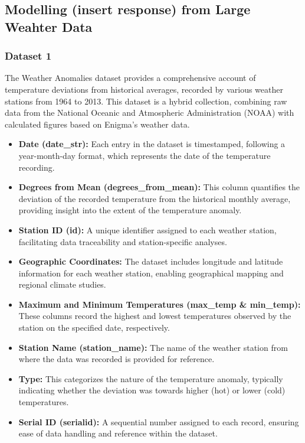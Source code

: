 \documentclass[12pt, twoside,hidelinks]{article}
\theoremstyle{definition}
\numberwithin{equation}{section}
\begin{document}
\subsection{Modelling (insert response) from Large Weahter Data}


\subsubsection*{Dataset 1}


The Weather Anomalies dataset provides a comprehensive account of temperature deviations from historical averages, recorded by various weather stations from 1964 to 2013. This dataset is a hybrid collection, combining raw data from the National Oceanic and Atmospheric Administration (NOAA) with calculated figures based on Enigma's weather data.

\begin{itemize}
    \item \textbf{Date (date\_str):} Each entry in the dataset is timestamped, following a year-month-day format, which represents the date of the temperature recording.
    
    \item \textbf{Degrees from Mean (degrees\_from\_mean):} This column quantifies the deviation of the recorded temperature from the historical monthly average, providing insight into the extent of the temperature anomaly.
    
    \item \textbf{Station ID (id):} A unique identifier assigned to each weather station, facilitating data traceability and station-specific analyses.
    
    \item \textbf{Geographic Coordinates:} The dataset includes longitude and latitude information for each weather station, enabling geographical mapping and regional climate studies.
    
    \item \textbf{Maximum and Minimum Temperatures (max\_temp \& min\_temp):} These columns record the highest and lowest temperatures observed by the station on the specified date, respectively.
    
    \item \textbf{Station Name (station\_name):} The name of the weather station from where the data was recorded is provided for reference.
    
    \item \textbf{Type:} This categorizes the nature of the temperature anomaly, typically indicating whether the deviation was towards higher (hot) or lower (cold) temperatures.
    
    \item \textbf{Serial ID (serialid):} A sequential number assigned to each record, ensuring ease of data handling and reference within the dataset.
\end{itemize}
\end{document}

